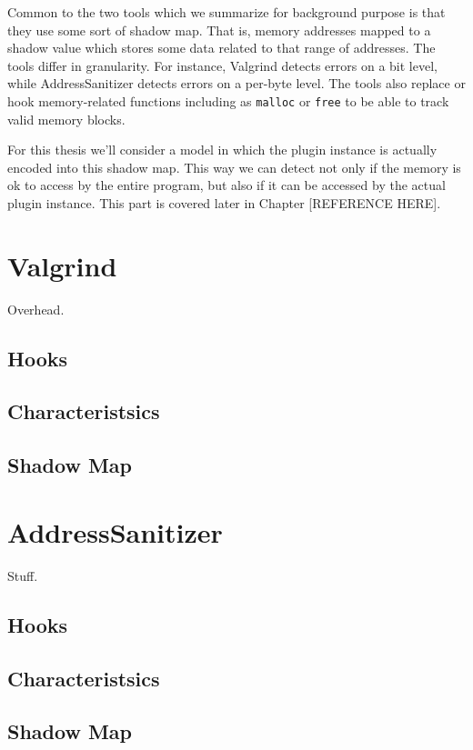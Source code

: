 Common to the two tools which we summarize for background purpose is that they
use some sort of shadow map. That is, memory addresses mapped to a shadow value
which stores some data related to that range of addresses. The tools differ in
granularity. For instance, Valgrind detects errors on a bit level, while
AddressSanitizer detects errors on a per-byte level. The tools also replace or
hook memory-related functions including as \texttt{malloc} or \texttt{free} to
be able to track valid memory blocks.

For this thesis we'll consider a model in which the plugin instance is actually
encoded into this shadow map. This way we can detect not only if the memory is
ok to access by the entire program, but also if it can be accessed by the actual
plugin instance. This part is covered later in Chapter [REFERENCE HERE].

\section {Valgrind}

Overhead.

\subsection {Hooks}

\subsection {Characteristsics}

\subsection {Shadow Map}

\section {AddressSanitizer}

Stuff.

\subsection {Hooks}

\subsection {Characteristsics}

\subsection {Shadow Map}

